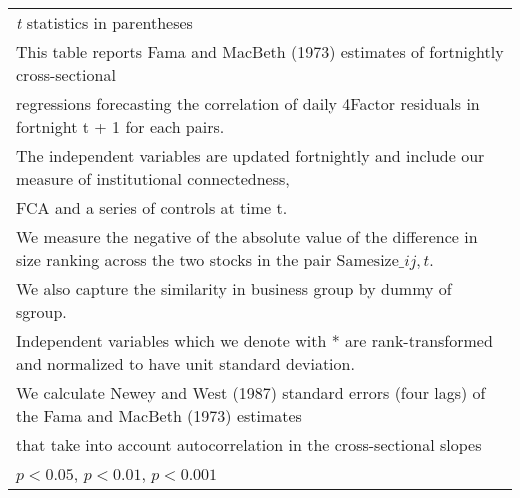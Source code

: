 {\begin{tabular}{l*{7}{c}}
\hline\hline
\multicolumn{8}{l}{\footnotesize \textit{t} statistics in parentheses}\\
\multicolumn{8}{l}{\footnotesize This table reports Fama and MacBeth (1973) estimates of fortnightly cross-sectional}\\
\multicolumn{8}{l}{\footnotesize  regressions forecasting the correlation of daily 4Factor residuals in fortnight t + 1 for each pairs.}\\
\multicolumn{8}{l}{\footnotesize The independent variables are updated fortnightly and include our measure of institutional connectedness,}\\
\multicolumn{8}{l}{\footnotesize  FCA and a series of controls at time t.}\\
\multicolumn{8}{l}{\footnotesize We measure the negative of the absolute value of the difference in size ranking across the two stocks in the pair $ \text{Samesize}\_{ij,t} $.}\\
\multicolumn{8}{l}{\footnotesize We also capture the similarity in business group by dummy of sgroup.}\\
\multicolumn{8}{l}{\footnotesize Independent variables which  we denote with * are rank-transformed and normalized to have unit standard deviation.}\\
\multicolumn{8}{l}{\footnotesize  We calculate Newey and West (1987) standard errors (four lags) of the Fama and MacBeth (1973) estimates }\\
\multicolumn{8}{l}{\footnotesize  that take into account autocorrelation in the cross-sectional slopes}\\
\multicolumn{8}{l}{\footnotesize \sym{*} \(p<0.05\), \sym{**} \(p<0.01\), \sym{***} \(p<0.001\)}\\
\end{tabular}
}
